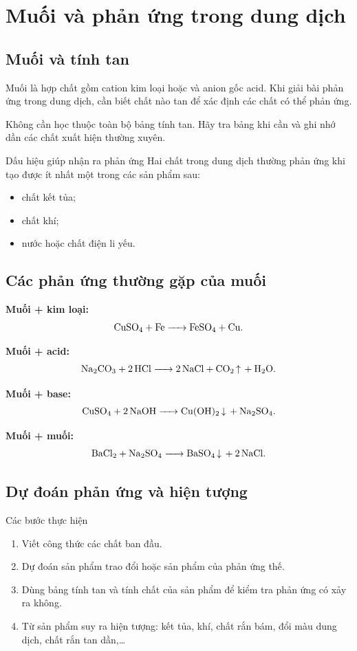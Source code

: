 \section{Muối và phản ứng trong dung dịch}

\subsection{Muối và tính tan}

Muối là hợp chất gồm cation kim loại hoặc  và anion gốc acid. Khi giải bài phản ứng trong dung dịch, cần biết chất nào tan để xác định các chất có thể phản ứng.

Không cần học thuộc toàn bộ bảng tính tan. Hãy tra bảng khi cần và ghi nhớ dần các chất xuất hiện thường xuyên.

\begin{ghinho}{Dấu hiệu giúp nhận ra phản ứng}
Hai chất trong dung dịch thường phản ứng khi tạo được ít nhất một trong các sản phẩm sau:
\begin{itemize}
\item chất kết tủa;
\item chất khí;
\item nước hoặc chất điện li yếu.
\end{itemize}
\end{ghinho}

\subsection{Các phản ứng thường gặp của muối}

\textbf{Muối + kim loại:}
\[
\ce{CuSO4 + Fe -> FeSO4 + Cu}.
\]

\textbf{Muối + acid:}
\[
\ce{Na2CO3 + 2HCl -> 2NaCl + CO2 ^ + H2O}.
\]

\textbf{Muối + base:}
\[
\ce{CuSO4 + 2NaOH -> Cu(OH)2 v + Na2SO4}.
\]

\textbf{Muối + muối:}
\[
\ce{BaCl2 + Na2SO4 -> BaSO4 v + 2NaCl}.
\]

\subsection{Dự đoán phản ứng và hiện tượng}

\begin{ghinho}{Các bước thực hiện}
\begin{enumerate}
\item Viết công thức các chất ban đầu.
\item Dự đoán sản phẩm trao đổi hoặc sản phẩm của phản ứng thế.
\item Dùng bảng tính tan và tính chất của sản phẩm để kiểm tra phản ứng có xảy ra không.
\item Từ sản phẩm suy ra hiện tượng: kết tủa, khí, chất rắn bám, đổi màu dung dịch, chất rắn tan dần,\ldots
\end{enumerate}
\end{ghinho}

